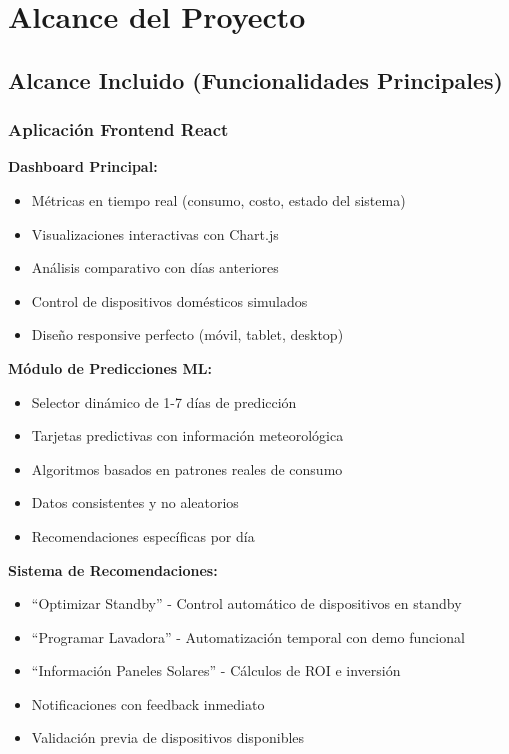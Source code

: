 \documentclass[12pt,a4paper,spanish]{article}
\begin{document}
\section{Alcance del Proyecto}

\subsection{Alcance Incluido (Funcionalidades Principales)}

\subsubsection{Aplicación Frontend React}

\textbf{Dashboard Principal:}
\begin{itemize}
    \item Métricas en tiempo real (consumo, costo, estado del sistema)
    \item Visualizaciones interactivas con Chart.js
    \item Análisis comparativo con días anteriores
    \item Control de dispositivos domésticos simulados
    \item Diseño responsive perfecto (móvil, tablet, desktop)
\end{itemize}

\textbf{Módulo de Predicciones ML:}
\begin{itemize}
    \item Selector dinámico de 1-7 días de predicción
    \item Tarjetas predictivas con información meteorológica
    \item Algoritmos basados en patrones reales de consumo
    \item Datos consistentes y no aleatorios
    \item Recomendaciones específicas por día
\end{itemize}

\textbf{Sistema de Recomendaciones:}
\begin{itemize}
    \item ``Optimizar Standby'' - Control automático de dispositivos en standby
    \item ``Programar Lavadora'' - Automatización temporal con demo funcional
    \item ``Información Paneles Solares'' - Cálculos de ROI e inversión
    \item Notificaciones con feedback inmediato
    \item Validación previa de dispositivos disponibles
\end{itemize}
\end{document}
